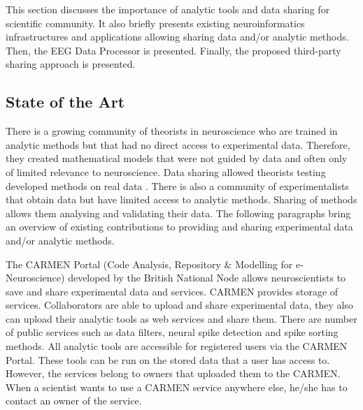 \documentclass{frontiersSCNS} %
\begin{document}
This section discusses the importance of analytic tools and data sharing for scientific community. It also briefly presents existing neuroinformatics infrastructures and applications allowing sharing data and/or analytic methods. Then, the EEG Data Processor is presented. Finally, the proposed third-party sharing approach is presented. 
\cite{chapter}




\subsection{State of the Art}
There is a growing community of theorists in neuroscience who are trained in analytic methods but that had no direct access to experimental data. Therefore, they created mathematical models that were not guided by data and often only of limited relevance to neuroscience. Data sharing allowed theorists testing developed methods on real data \cite{Tetters08}. There is also a community of experimentalists that obtain data but have limited access to analytic methods. Sharing of methods allows them analysing and validating their data. The following paragraphs bring an overview of existing contributions to providing and sharing experimental data and/or analytic methods.

The CARMEN Portal \cite{Watson07} (Code Analysis, Repository \& Modelling for e-Neuroscience) developed by the British National Node allows neuroscientists to save and share experimental data and services. CARMEN provides storage of services. Collaborators are able to upload and share experimental data, they also can upload their analytic tools as web services and share them. There are number of public services such as data filters, neural spike detection and spike sorting methods. All analytic tools are accessible for registered users via the CARMEN Portal. These tools can be run on the stored data that a user has access to. However, the services belong to owners that uploaded them to the CARMEN. When a scientist wants to use a CARMEN service anywhere else, he/she has to contact an owner of the service.
\end{document}
